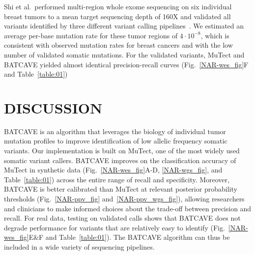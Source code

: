 \documentclass[a4,center,fleqn]{NAR}
\newcommand{\batcave}{BATCAVE\xspace}
\begin{document}
Shi et al.\ performed multi-region whole exome sequencing on six individual breast tumors to a mean target sequencing depth of 160X and validated all variants identified by three different variant calling pipelines~\cite{Shi2018}.
We estimated an average per-base mutation rate for these tumor regions of $4\cdot10^{-8}$, which is consistent with observed mutation rates for breast cancers \cite{Alexandrov2019} and with the low number of validated somatic mutations.
For the validated variants, MuTect and \batcave yielded almost identical precision-recall curves (Fig.~\ref{NAR-wes_fig}F and Table~\ref{table:01})

\section{DISCUSSION}
 

\batcave is an algorithm that leverages the biology of individual tumor mutation profiles to improve identification of low allelic frequency somatic variants.
Our implementation is built on MuTect, one of the most widely used somatic variant callers.
\batcave improves on the classification accuracy of MuTect in synthetic data (Fig.~\ref{NAR-wes_fig}A-D,  \ref{NAR-wgs_fig}, and Table~\ref{table:01}) across the entire range of recall and specificity.
Moreover, \batcave is better calibrated than MuTect at relevant posterior probability thresholds (Fig.~\ref{NAR-ppv_fig} and~\ref{NAR-ppv_wgs_fig}), allowing researchers and clinicians to make informed choices about the trade-off between precision and recall.
For real data, testing on validated calls shows that \batcave does not degrade performance for variants that are relatively easy to identify (Fig.~\ref{NAR-wes_fig}E\&F and Table~\ref{table:01}).
The \batcave algorithm can thus be included in a wide variety of sequencing pipelines.
\end{document}
